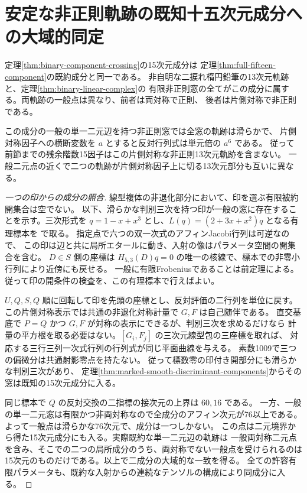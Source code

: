 \section{安定な非正則軌跡の既知十五次元成分への大域的同定}
\label{sec:binary-global-component}
\begin{theorem}\label{thm:binary-global-component}
定理\ref{thm:binary-component-crossing}の15次元成分は
定理\ref{thm:full-fifteen-component}の既約成分と同一である。
非自明な二捩れ楕円鉛筆の13次元軌跡と、定理\ref{thm:binary-linear-complex}の
有限非正則窓の全てがこの成分に属する。両軌跡の一般点は異なり、前者は両対称で正則、
後者は片側対称で非正則である。

この成分の一般の単一二元辺を持つ非正則窓では全窓の軌跡は滑らかで、
片側対称因子への横断変数を $a$ とすると反対行列式は単元倍の $a^6$ である。
従って前節までの残余階数15因子はこの片側対称な非正則13次元軌跡を含まない。
一般二元点の近くで二つの軌跡が片側対称因子上に切る13次元部分も互いに異なる。
\end{theorem}
\begin{proof}[一つの印からの成分の照合]
線型複体の非退化部分において、印を選ぶ有限被約開集合は空でない。
以下、滑らかな判別三次を持つ印が一般の窓に存在することを示す。三次形式を
$q=1-x+x^3$ とし、$L(q)=(2+3x+x^2)q$ となる有理標本を
で取る。
指定点で六つの双一次式のアフィンJacobi行列は可逆なので、
この印は辺と共に局所エタールに動き、入射の像はパラメータ空間の開集合を含む。
$D\in S$ 側の座標は $H_{5,3}(D)q=0$ の唯一の核線で、標本での非零小行列により近傍にも戻せる。
一般に有限Frobeniusであることは前定理による。従って印の開条件の検査を、この有理標本で行えばよい。

$U,Q,S,Q$ 順に回転して印を先頭の座標とし、反対評価の二行列を単位に戻す。
この片側対称表示では共通の非退化対称計量で $G,F$ は自己随伴である。
直交基底で $P=Q$ かつ $G,F$ が対称の表示にできるが、判別三次を求めるだけなら
計量の平方根を取る必要はない。$[G_i,F_j]$ の三次元線型包の三座標を取れば、
対応する三行三列一次式行列の行列式が同じ平面曲線を与える。
素数1009で三つの偏微分は共通射影零点を持たない。
従って標数零の印付き開部分にも滑らかな判別三次があり、
定理\ref{thm:marked-smooth-discriminant-components}からその窓は既知の15次元成分に入る。

同じ標本で $Q$ の反対交換の二指標の接次元の上界は $60,16$ である。
一方、一般の単一二元窓は有限かつ非両対称なので全成分のアフィン次元が76以上である。
よって一般点は滑らかな76次元で、成分は一つしかない。
この点は二元境界から得た15次元成分にも入る。実際既約な単一二元辺の軌跡は
一般両対称二元点を含み、そこでの二つの局所成分のうち、両対称でない一般点を受けられるのは
15次元のものだけである。以上で二成分の大域的な一致を得る。
全ての許容有限パラメータも、既約な入射からの連続なテンソルの構成により同成分に入る。
\end{proof}
